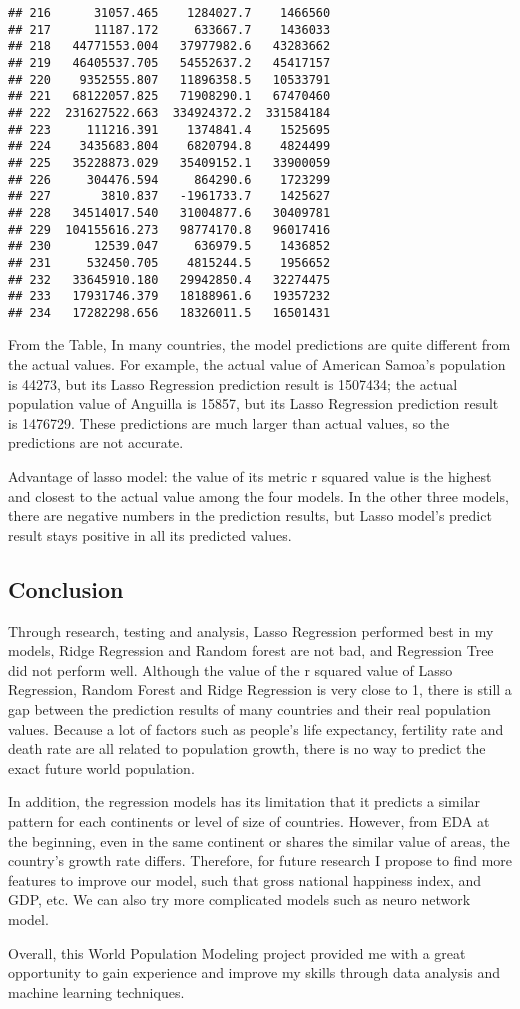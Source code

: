 \documentclass[
]{article}
\begin{document}
\begin{verbatim}
## 216      31057.465    1284027.7    1466560
## 217      11187.172     633667.7    1436033
## 218   44771553.004   37977982.6   43283662
## 219   46405537.705   54552637.2   45417157
## 220    9352555.807   11896358.5   10533791
## 221   68122057.825   71908290.1   67470460
## 222  231627522.663  334924372.2  331584184
## 223     111216.391    1374841.4    1525695
## 224    3435683.804    6820794.8    4824499
## 225   35228873.029   35409152.1   33900059
## 226     304476.594     864290.6    1723299
## 227       3810.837   -1961733.7    1425627
## 228   34514017.540   31004877.6   30409781
## 229  104155616.273   98774170.8   96017416
## 230      12539.047     636979.5    1436852
## 231     532450.705    4815244.5    1956652
## 232   33645910.180   29942850.4   32274475
## 233   17931746.379   18188961.6   19357232
## 234   17282298.656   18326011.5   16501431
\end{verbatim}

From the Table, In many countries, the model predictions are quite
different from the actual values. For example, the actual value of
American Samoa's population is 44273, but its Lasso Regression
prediction result is 1507434; the actual population value of Anguilla is
15857, but its Lasso Regression prediction result is 1476729. These
predictions are much larger than actual values, so the predictions are
not accurate.

Advantage of lasso model: the value of its metric r squared value is the
highest and closest to the actual value among the four models. In the
other three models, there are negative numbers in the prediction
results, but Lasso model's predict result stays positive in all its
predicted values.

\hypertarget{conclusion}{%
\subsection{Conclusion}\label{conclusion}}

Through research, testing and analysis, Lasso Regression performed best
in my models, Ridge Regression and Random forest are not bad, and
Regression Tree did not perform well. Although the value of the r
squared value of Lasso Regression, Random Forest and Ridge Regression is
very close to 1, there is still a gap between the prediction results of
many countries and their real population values. Because a lot of
factors such as people's life expectancy, fertility rate and death rate
are all related to population growth, there is no way to predict the
exact future world population.

In addition, the regression models has its limitation that it predicts a
similar pattern for each continents or level of size of countries.
However, from EDA at the beginning, even in the same continent or shares
the similar value of areas, the country's growth rate differs.
Therefore, for future research I propose to find more features to
improve our model, such that gross national happiness index, and GDP,
etc. We can also try more complicated models such as neuro network
model.

Overall, this World Population Modeling project provided me with a great
opportunity to gain experience and improve my skills through data
analysis and machine learning techniques.
\end{document}
